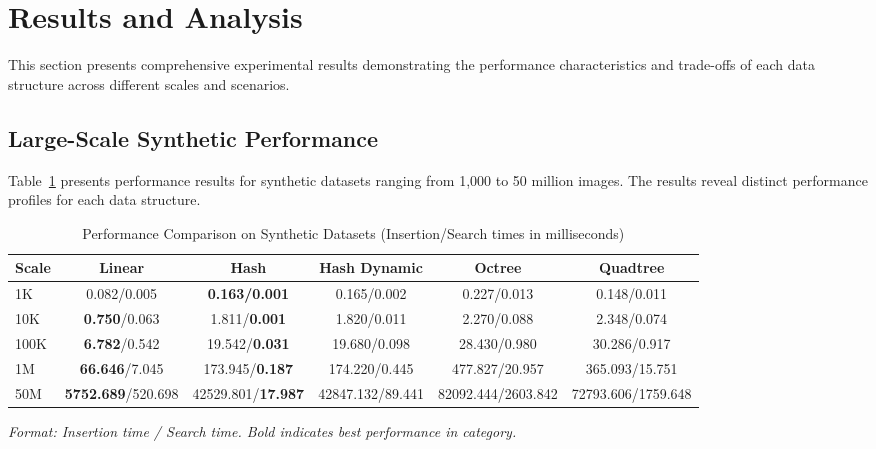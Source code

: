 \documentclass{sbc2023}
\begin{document}
\section{Results and Analysis}
\label{sec:results}

This section presents comprehensive experimental results demonstrating the performance characteristics and trade-offs of each data structure across different scales and scenarios.

\subsection{Large-Scale Synthetic Performance}

Table~\ref{tab:synthetic_performance} presents performance results for synthetic datasets ranging from 1,000 to 50 million images. The results reveal distinct performance profiles for each data structure.

\begin{table}[H]
    \footnotesize 
    \centering
    \caption{Performance Comparison on Synthetic Datasets (Insertion/Search times in milliseconds)}
    \label{tab:synthetic_performance}
    \setlength{\tabcolsep}{3pt}
    \begin{tabularx}{\columnwidth}{|l|c|c|c|c|c|}
        \hline
        \textbf{Scale} & \textbf{Linear} & \textbf{Hash} & \textbf{Hash Dynamic} & \textbf{Octree} & \textbf{Quadtree} \\
        \hline
        1K & 0.082/0.005 & \textbf{0.163/0.001} & 0.165/0.002 & 0.227/0.013 & 0.148/0.011 \\
        10K & \textbf{0.750}/0.063 & 1.811/\textbf{0.001} & 1.820/0.011 & 2.270/0.088 & 2.348/0.074 \\
        100K & \textbf{6.782}/0.542 & 19.542/\textbf{0.031} & 19.680/0.098 & 28.430/0.980 & 30.286/0.917 \\
        1M & \textbf{66.646}/7.045 & 173.945/\textbf{0.187} & 174.220/0.445 & 477.827/20.957 & 365.093/15.751 \\
        50M & \textbf{5752.689}/520.698 & 42529.801/\textbf{17.987} & 42847.132/89.441 & 82092.444/2603.842 & 72793.606/1759.648 \\
        \hline
    \end{tabularx}
    \vspace{0.2cm}
    \begin{minipage}{\columnwidth}
    \footnotesize
    \textit{Format: Insertion time / Search time. Bold indicates best performance in category.}
    \end{minipage}
\end{table}
\end{document}
